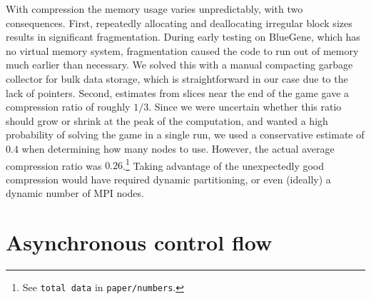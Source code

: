 \documentclass[conference]{IEEEtran}
\begin{document}
With compression the memory usage varies unpredictably, with two consequences.  First, repeatedly
allocating and deallocating irregular block sizes results in significant fragmentation.  During early testing on
BlueGene, which has no virtual memory system, fragmentation caused the code to run out of memory much earlier
than necessary.  We solved this with a manual compacting garbage collector for bulk data storage, which is
straightforward in our case due to the lack of pointers.  Second, estimates from slices near the end of the game
gave a compression ratio of roughly $1/3$.  Since we were uncertain whether this ratio should grow or shrink at
the peak of the computation, and wanted a high probability of solving the game in a single run, we used a
conservative estimate of $0.4$ when determining how many nodes to use.  However, the actual average compression
ratio was $0.26$.\cprotect\footnote{See \verb+total data+ in \verb+paper/numbers+.}  Taking advantage
of the unexpectedly good compression would have required dynamic partitioning, or even (ideally) a dynamic
number of MPI nodes.

\section{Asynchronous control flow}
\end{document}
